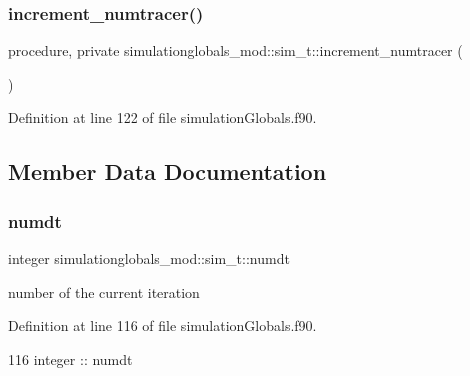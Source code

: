 \subsubsection{\texorpdfstring{increment\+\_\+numtracer()}{increment\_numtracer()}}
{\footnotesize\ttfamily procedure, private simulationglobals\+\_\+mod\+::sim\+\_\+t\+::increment\+\_\+numtracer (\begin{DoxyParamCaption}{ }\end{DoxyParamCaption})\hspace{0.3cm}{\ttfamily [private]}}



Definition at line 122 of file simulation\+Globals.\+f90.



\subsection{Member Data Documentation}
\mbox{\label{structsimulationglobals__mod_1_1sim__t_acf2dd4822ebd48541ac6d018038b286a}} 
\subsubsection{\texorpdfstring{numdt}{numdt}}
{\footnotesize\ttfamily integer simulationglobals\+\_\+mod\+::sim\+\_\+t\+::numdt\hspace{0.3cm}{\ttfamily [private]}}



number of the current iteration 



Definition at line 116 of file simulation\+Globals.\+f90.


\begin{DoxyCode}
116         \textcolor{keywordtype}{integer} :: numdt
\end{DoxyCode}
\mbox{\label{structsimulationglobals__mod_1_1sim__t_a23cc2df1e0cf56990759076ed07b69f1}} 

